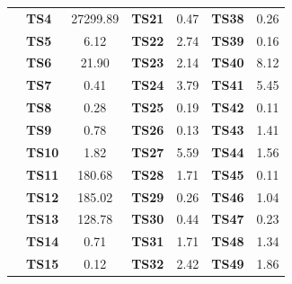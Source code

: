 \begin{table}[h]
{\begin{tabular}{|l|l|S[table-format=3.2]|l|S[table-format=3.2]|l|S[table-format=3.2]|}
			& \textbf{TS4}       & 27299.89 & \textbf{TS21}      & 0.47                          & \textbf{TS38}      & 0.26                           \\  
			& \textbf{TS5}       & 6.12                             & \textbf{TS22}      & 2.74                          & \textbf{TS39}      & 0.16                           \\  
			& \textbf{TS6}       & 21.90                            & \textbf{TS23}      & 2.14                          & \textbf{TS40}      & 8.12                           \\  
			& \textbf{TS7}       & 0.41                             & \textbf{TS24}      & 3.79                          & \textbf{TS41}      & 5.45                           \\  
			& \textbf{TS8}       & 0.28                             & \textbf{TS25}      & 0.19                          & \textbf{TS42}      & 0.11                           \\  
			& \textbf{TS9}       & 0.78                             & \textbf{TS26}      & 0.13                          & \textbf{TS43}      & 1.41                           \\  
			& \textbf{TS10}      & 1.82                             & \textbf{TS27}      & 5.59                          & \textbf{TS44}      & 1.56                           \\  
			& \textbf{TS11}      & 180.68   & \textbf{TS28}      & 1.71                          & \textbf{TS45}      & 0.11                           \\  
			& \textbf{TS12}      & 185.02   & \textbf{TS29}      & 0.26                          & \textbf{TS46}      & 1.04                           \\  
			& \textbf{TS13}      & 128.78   & \textbf{TS30}      & 0.44                          & \textbf{TS47}      & 0.23                           \\  
			& \textbf{TS14}      & 0.71                             & \textbf{TS31}      & 1.71                          & \textbf{TS48}      & 1.34                           \\  
			& \textbf{TS15}      & 0.12                             & \textbf{TS32}      & 2.42                          & \textbf{TS49}      & 1.86                           \\  

\end{tabular}}
\end{table}
